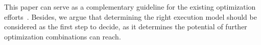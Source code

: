 
\vspace{0.7em}
This paper can serve as a complementary guideline for the existing optimization efforts~\cite{flexcl_tc18, flexcl_dac17, fpga_opencl_model_hpca16}. Besides, we argue that determining the right execution model should be considered as the first step to decide, as it determines the potential of further optimization combinations can reach. 


